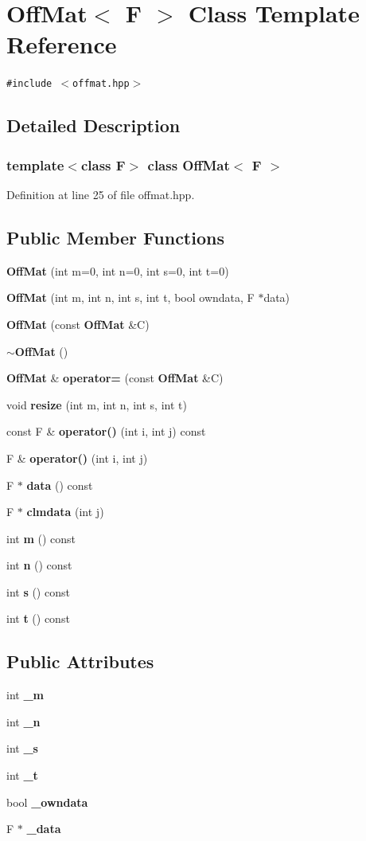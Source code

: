 \section{Off\-Mat$<$ F $>$ Class Template Reference}
\label{classOffMat}
{\tt \#include $<$offmat.hpp$>$}



\subsection{Detailed Description}
\subsubsection*{template$<$class F$>$ class Off\-Mat$<$ F $>$}





Definition at line 25 of file offmat.hpp.\subsection*{Public Member Functions}
\begin{CompactItemize}
\item 
{\bf Off\-Mat} (int m=0, int n=0, int s=0, int t=0)
\item 
{\bf Off\-Mat} (int m, int n, int s, int t, bool owndata, F $\ast$data)
\item 
{\bf Off\-Mat} (const {\bf Off\-Mat} \&C)
\item 
{\bf $\sim$Off\-Mat} ()
\item 
{\bf Off\-Mat} \& {\bf operator=} (const {\bf Off\-Mat} \&C)
\item 
void {\bf resize} (int m, int n, int s, int t)
\item 
const F \& {\bf operator()} (int i, int j) const 
\item 
F \& {\bf operator()} (int i, int j)
\item 
F $\ast$ {\bf data} () const 
\item 
F $\ast$ {\bf clmdata} (int j)
\item 
int {\bf m} () const 
\item 
int {\bf n} () const 
\item 
int {\bf s} () const 
\item 
int {\bf t} () const 
\end{CompactItemize}
\subsection*{Public Attributes}
\begin{CompactItemize}
\item 
int {\bf \_\-m}
\item 
int {\bf \_\-n}
\item 
int {\bf \_\-s}
\item 
int {\bf \_\-t}
\item 
bool {\bf \_\-owndata}
\item 
F $\ast$ {\bf \_\-data}
\end{CompactItemize}


